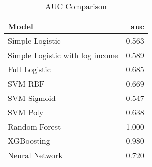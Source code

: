 \begin{table}
\caption{AUC Comparison}
\label{tab:auc_compare}
\begin{tabular}{lr}
\toprule
Model & auc \\
\midrule
Simple Logistic & 0.563 \\
Simple Logistic with log income & 0.589 \\
Full Logistic & 0.685 \\
SVM RBF & 0.669 \\
SVM Sigmoid & 0.547 \\
SVM Poly & 0.638 \\
Random Forest & 1.000 \\
XGBoosting & 0.980 \\
Neural Network & 0.720 \\
\bottomrule
\end{tabular}
\end{table}
